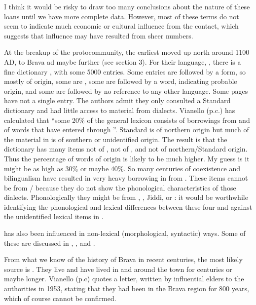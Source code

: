 \documentclass[output=paper
,newtxmath
,modfonts
,nonflat]{langsci/langscibook}
\begin{document}
  I think it would be risky to draw too many conclusions about the nature of these loans until we have more complete data. However, most of these terms do not seem to indicate much economic or cultural influence from the  contact, which suggests that  influence may have resulted from sheer numbers. 

  At the breakup of the protocommunity, the earliest  moved up north around 1100 AD, to Brava ad maybe further (see section 3). For their language, , there is a fine dictionary \citep{Kisseberth2004}, with some 5000 entries. Some entries are followed by a  form, so mostly of  origin, some are , some are followed by a  word, indicating probable  origin, and some are followed by no reference to any other language. Some pages have not a single  entry. The authors admit they only consulted a Standard  dictionary and had little access to material from  dialects. Vianello (p.c.) has calculated that “some 20\% of the general lexicon consists of borrowings from  and of  words that have entered  through ”. Standard  is of northern origin but much of the material in  is of southern or unidentified  origin. The result is that the dictionary has many items not of , not of , and not of northern/Standard  origin. Thus the percentage of words of  origin is likely to be much higher. My guess is it might be as high as 30\% or maybe 40\%. So many centuries of coexistence and bilingualism have resulted in very heavy borrowing in  from . These items cannot be from / because they do not show the phonological characteristics of those dialects. Phonologically they might be from , , Jiddi, or : it would be worthwhile identifying the phonological and lexical differences between these four and against the unidentified lexical items in . 

   has also been influenced in non-lexical (morphological, syntactic) ways. Some of these are discussed in \citet{nurse1991}, \citet{Henderson2010}, and \citet{Vianello2015}. 

From what we know of the history of Brava in recent centuries, the most likely source is . They live and have lived in and around the town for centuries or maybe longer. Vianello (p.c) quotes a letter, written by influential  elders to the  authorities in 1953, stating that they had been in the Brava region for 800 years, which of course cannot be confirmed. 
\end{document}
